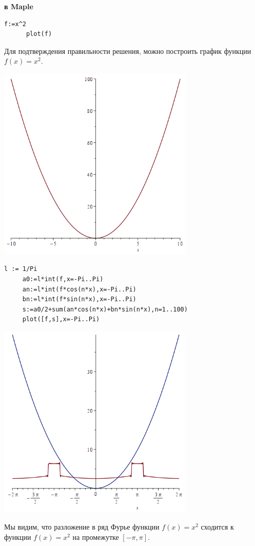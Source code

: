 {  \textbf{в Maple}
    \begin{lstlisting}[style=maple]
      f:=x^2
      plot(f)
    \end{lstlisting}
    Для подтверждения правильности решения, можно построить график функции $f(x)=x^2$.
   
      \begin{center}
        \includegraphics[width=0.7\textwidth]{2.png}  %
        \end{center}
        \begin{lstlisting}[style=maple]
      l := 1/Pi
     a0:=l*int(f,x=-Pi..Pi)
     an:=l*int(f*cos(n*x),x=-Pi..Pi)
     bn:=l*int(f*sin(n*x),x=-Pi..Pi)
     s:=a0/2+sum(an*cos(n*x)+bn*sin(n*x),n=1..100)
     plot([f,s],x=-Pi..Pi)
        \end{lstlisting}
        
        \begin{center}
        \includegraphics[width=0.7\textwidth]{1.png}  %
        \end{center}
Мы видим, что разложение в ряд Фурье функции $f(x)=x^2$ сходится к функции $f(x)=x^2$ на
промежутке $[-\pi,\pi]$.
        }

